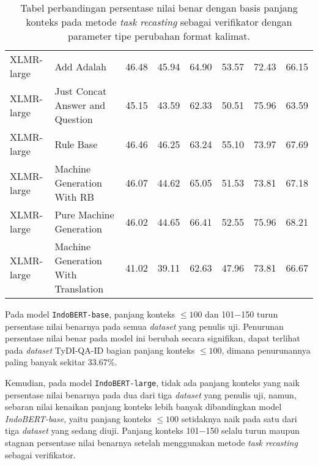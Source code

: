 \begin{table}[H]
\begin{tabular}{llrrrrrr}
    XLMR-large &                          Add Adalah &                  46.48 &                  45.94 &                  64.90 &                  53.57 &                  72.43 &                  66.15 \\
    XLMR-large &     Just Concat Answer and Question &                  45.15 &                  43.59 &                  62.33 &                  50.51 &                  75.96 &                  63.59 \\
    XLMR-large &                           Rule Base &                  46.46 &                  46.25 &                  63.24 &                  55.10 &                  73.97 &                  67.69 \\
    XLMR-large &          Machine Generation With RB &                  46.07 &                  44.62 &                  65.05 &                  51.53 &                  73.81 &                  67.18 \\
    XLMR-large &             Pure Machine Generation &                  46.02 &                  44.65 &                  66.41 &                  52.55 &                  75.96 &                  68.21 \\
    XLMR-large & Machine Generation With Translation &                  41.02 &                  39.11 &                  62.63 &                  47.96 &                  73.81 &                  66.67 \\
\bottomrule
\end{tabular}
\caption{Tabel perbandingan persentase nilai benar dengan basis panjang konteks pada metode \emph{task recasting} sebagai verifikator dengan parameter tipe perubahan format kalimat.}
\end{table}

Pada model \texttt{IndoBERT-base}, panjang konteks $\leq100$ dan 101$-$150 turun persentase nilai benarnya pada semua \emph{dataset} yang penulis uji. Penurunan persentase nilai benar pada model ini berubah secara signifikan, dapat terlihat pada \emph{dataset} TyDI-QA-ID bagian panjang konteks $\leq100$, dimana penurunannya paling banyak sekitar 33.67\%.

Kemudian, pada model \texttt{IndoBERT-large}, tidak ada panjang konteks yang naik persentase nilai benarnya pada dua dari tiga \emph{dataset} yang penulis uji, namun, sebaran nilai kenaikan panjang konteks lebih banyak dibandingkan model \emph{IndoBERT-base}, yaitu panjang konteks  $\leq100$ setidaknya naik pada satu dari tiga \emph{dataset} yang sedang diuji. Panjang konteks  101$-$150 selalu turun maupun stagnan persentase nilai benarnya setelah menggunakan metode \emph{task recasting} sebagai verifikator.


